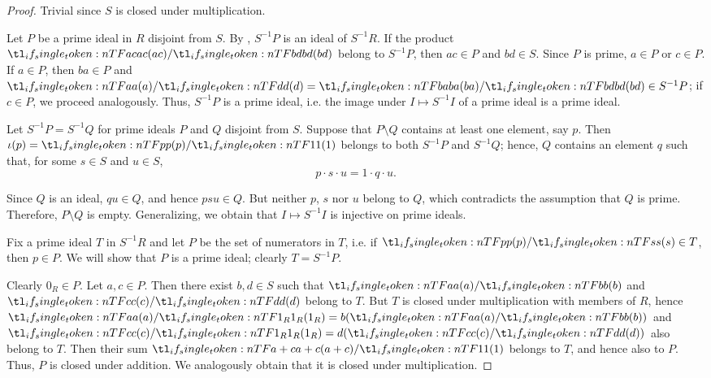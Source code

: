 \begin{proof}
   Trivial since \( S \) is closed under multiplication.

   Let \( P \) be a prime ideal in \( R \) disjoint from \( S \). By , \( S^{-1} P \) is an ideal of \( S^{-1} R \). If the product \( \ifrac {ac} {bd} \) belong to \( S^{-1} P \), then \( ac \in P \) and \( bd \in S \). Since \( P \) is prime, \( a \in P \) or \( c \in P \). If \( a \in P \), then \( ba \in P \) and \( \ifrac a d = \ifrac {ba} {bd} \in S^{-1} P \); if \( c \in P \), we proceed analogously. Thus, \( S^{-1} P \) is a prime ideal, i.e. the image under \( I \mapsto S^{-1} I \) of a prime ideal is a prime ideal.

   Let \( S^{-1} P = S^{-1} Q \) for prime ideals \( P \) and \( Q \) disjoint from \( S \). Suppose that \( P \setminus Q \) contains at least one element, say \( p \). Then \( \iota(p) = \ifrac p 1 \) belongs to both \( S^{-1} P \) and \( S^{-1} Q \); hence, \( Q \) contains an element \( q \) such that, for some \( s \in S \) and \( u \in S \),
  \begin{equation*}
    p \cdot s \cdot u = 1 \cdot q \cdot u.
  \end{equation*}

  Since \( Q \) is an ideal, \( qu \in Q \), and hence \( psu \in Q \). But neither \( p \), \( s \) nor \( u \) belong to \( Q \), which contradicts the assumption that \( Q \) is prime. Therefore, \( P \setminus Q \) is empty. Generalizing, we obtain that \( I \mapsto S^{-1} I \) is injective on prime ideals.

   Fix a prime ideal \( T \) in \( S^{-1} R \) and let \( P \) be the set of numerators in \( T \), i.e. if \( \ifrac p s \in T \), then \( p \in P \). We will show that \( P \) is a prime ideal; clearly \( T = S^{-1} P \).

  Clearly \( 0_R \in P \). Let \( a, c \in P \). Then there exist \( b, d \in S \) such that \( \ifrac a b \) and \( \ifrac c d \) belong to \( T \). But \( T \) is closed under multiplication with members of \( R \), hence \( \ifrac a {1_R} = b (\ifrac a b) \) and \( \ifrac c {1_R} = d (\ifrac c d) \) also belong to \( T \). Then their sum \( \ifrac {a + c} 1 \) belongs to \( T \), and hence also to \( P \). Thus, \( P \) is closed under addition. We analogously obtain that it is closed under multiplication.


\end{proof}
